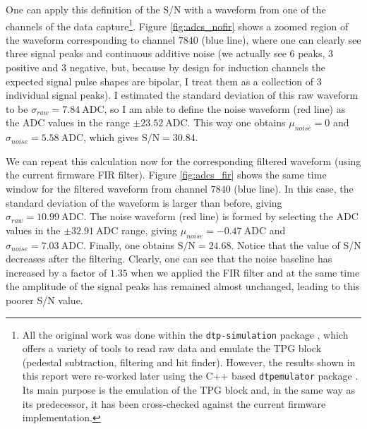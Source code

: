 One can apply this definition of the S/N with a waveform from one of the channels of the data capture\footnote{All the original work was done within the \texttt{dtp-simulation} package \cite{dtp-simulation}, which offers a variety of tools to read raw data and emulate the TPG block (pedestal subtraction, filtering and hit finder). However, the results shown in this report were re-worked later using the C++ based \texttt{dtpemulator} package \cite{dtpemulator}. Its main purpose is the emulation of the TPG block and, in the same way as its predecessor, it has been cross-checked against the current firmware implementation.}. Figure \ref{fig:adcs_nofir} shows a zoomed region of the waveform corresponding to channel $7840$ (blue line), where one can clearly see three signal peaks and continuous additive noise (we actually see 6 peaks, 3 positive and 3 negative, but, because by design for induction channels the expected signal pulse shapes are bipolar, I treat them as a collection of 3 individual signal peaks). I estimated the standard deviation of this raw waveform to be $\sigma_{raw} = 7.84 \ \mathrm{ADC}$, so I am able to define the noise waveform (red line) as the ADC values in the range $\pm 23.52 \ \mathrm{ADC}$. This way one obtains $\mu_{noise} = 0$ and $\sigma_{noise} = 5.58 \ \mathrm{ADC}$, which gives $\mathrm{S/N} = 30.84$.

We can repeat this calculation now for the corresponding filtered waveform (using the current firmware FIR filter). Figure \ref{fig:adcs_fir} shows the same time window for the filtered waveform from channel $7840$ (blue line). In this case, the standard deviation of the waveform is larger than before, giving $\sigma_{raw} = 10.99 \ \mathrm{ADC}$. The noise waveform (red line) is formed by selecting the ADC values in the $\pm 32.91 \ \mathrm{ADC}$ range, giving $\mu_{noise} = -0.47 \ \mathrm{ADC}$ and $\sigma_{noise} = 7.03 \ \mathrm{ADC}$. Finally, one obtains $\mathrm{S/N} = 24.68$. Notice that the value of S/N decreases after the filtering. Clearly, one can see that the noise baseline has increased by a factor of $1.35$ when we applied the FIR filter and at the same time the amplitude of the signal peaks has remained almost unchanged, leading to this poorer S/N value.

